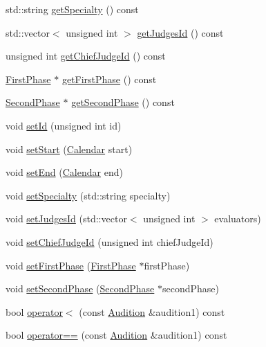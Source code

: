 \begin{DoxyCompactItemize}
\item 
std\+::string \hyperlink{class_audition_aaa7cac841f79eec747981194046818f5}{get\+Specialty} () const
\item 
std\+::vector$<$ unsigned int $>$ \hyperlink{class_audition_a405624b42fb47c297b3e11cc7c63e209}{get\+Judges\+Id} () const
\item 
unsigned int \hyperlink{class_audition_a03c7dee223c26f5527a637f2013acceb}{get\+Chief\+Judge\+Id} () const
\item 
\hyperlink{class_first_phase}{First\+Phase} $\ast$ \hyperlink{class_audition_ae725b5105db0f9350bc2a63593fa28b2}{get\+First\+Phase} () const
\item 
\hyperlink{class_second_phase}{Second\+Phase} $\ast$ \hyperlink{class_audition_af89b61cd4d55a1bee8d3590b1d6198c8}{get\+Second\+Phase} () const
\item 
void \hyperlink{class_audition_a2d0d263754db4ca7c99b4019a61dc6c2}{set\+Id} (unsigned int id)
\item 
void \hyperlink{class_audition_a65f617b37f5a3a65f37ad68e8a293e15}{set\+Start} (\hyperlink{class_calendar}{Calendar} start)
\item 
void \hyperlink{class_audition_add002a59ed08c058cee6635fa910380f}{set\+End} (\hyperlink{class_calendar}{Calendar} end)
\item 
void \hyperlink{class_audition_a708f47023fbf0d1d740cda888583b2bd}{set\+Specialty} (std\+::string specialty)
\item 
void \hyperlink{class_audition_a99c5d91a8d69b132fa0e35e0b88f0a1f}{set\+Judges\+Id} (std\+::vector$<$ unsigned int $>$ evaluators)
\item 
void \hyperlink{class_audition_a9a6e504bfa0ac383a13404a3a6544935}{set\+Chief\+Judge\+Id} (unsigned int chief\+Judge\+Id)
\item 
void \hyperlink{class_audition_a49ba58d1a2dd0322b84052633951285b}{set\+First\+Phase} (\hyperlink{class_first_phase}{First\+Phase} $\ast$first\+Phase)
\item 
void \hyperlink{class_audition_a39f0ffdb542593762083bb48ed5eb516}{set\+Second\+Phase} (\hyperlink{class_second_phase}{Second\+Phase} $\ast$second\+Phase)
\item 
bool \hyperlink{class_audition_ab9ceb3af47f97b5ca6e941712edf2db0}{operator$<$} (const \hyperlink{class_audition}{Audition} \&audition1) const
\item 
bool \hyperlink{class_audition_ac0cb2b6e7de7fd30691bbea60640bd2a}{operator==} (const \hyperlink{class_audition}{Audition} \&audition1) const
\item 

\end{DoxyCompactItemize}
